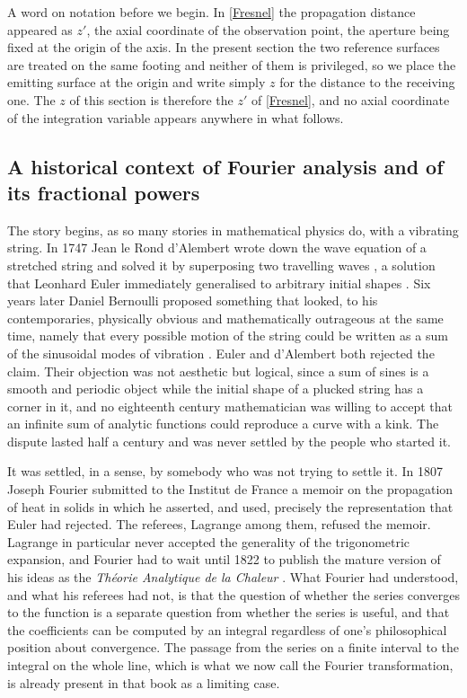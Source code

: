 	A word on notation before we begin. In \eqref{Fresnel} the propagation distance appeared as $z'$, the axial coordinate of the observation point, the aperture being fixed at the origin of the axis. In the present section the two reference surfaces are treated on the same footing and neither of them is privileged, so we place the emitting surface at the origin and write simply $z$ for the distance to the receiving one. The $z$ of this section is therefore the $z'$ of \eqref{Fresnel}, and no axial coordinate of the integration variable appears anywhere in what follows.


	\subsection{A historical context of Fourier analysis and of its fractional powers}

		The story begins, as so many stories in mathematical physics do, with a vibrating string. In 1747 Jean le Rond d'Alembert wrote down the wave equation of a stretched string and solved it by superposing two travelling waves \citep{dalembert1747recherches}, a solution that Leonhard Euler immediately generalised to arbitrary initial shapes \citep{euler1748vibration}. Six years later Daniel Bernoulli proposed something that looked, to his contemporaries, physically obvious and mathematically outrageous at the same time, namely that every possible motion of the string could be written as a sum of the sinusoidal modes of vibration \citep{bernoulli1753reflexions}. Euler and d'Alembert both rejected the claim. Their objection was not aesthetic but logical, since a sum of sines is a smooth and periodic object while the initial shape of a plucked string has a corner in it, and no eighteenth century mathematician was willing to accept that an infinite sum of analytic functions could reproduce a curve with a kink. The dispute lasted half a century and was never settled by the people who started it.

		It was settled, in a sense, by somebody who was not trying to settle it. In 1807 Joseph Fourier submitted to the Institut de France a memoir on the propagation of heat in solids in which he asserted, and used, precisely the representation that Euler had rejected. The referees, Lagrange among them, refused the memoir. Lagrange in particular never accepted the generality of the trigonometric expansion, and Fourier had to wait until 1822 to publish the mature version of his ideas as the \textit{Th\'eorie Analytique de la Chaleur} \citep{fourier1822theorie}. What Fourier had understood, and what his referees had not, is that the question of whether the series converges to the function is a separate question from whether the series is useful, and that the coefficients can be computed by an integral regardless of one's philosophical position about convergence. The passage from the series on a finite interval to the integral on the whole line, which is what we now call the Fourier transformation, is already present in that book as a limiting case.

